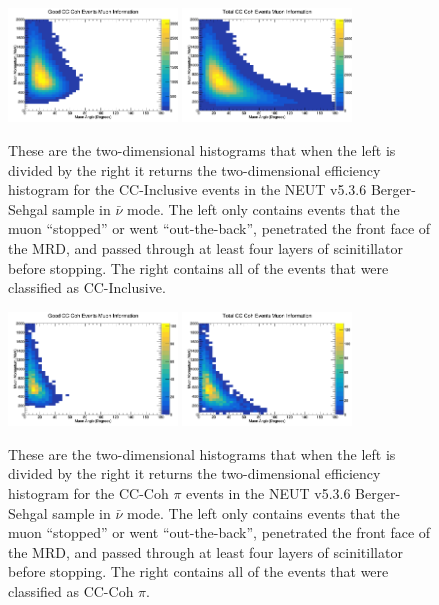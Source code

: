 \documentclass[11pt]{article}
\begin{document}
\begin{figure}[H]
\centering
\includegraphics[width=0.4\textwidth]{NewANMBergerSehgalImages/6-GoodCCCohMuonInfoANMBS.png}
\includegraphics[width=0.4\textwidth]{NewANMBergerSehgalImages/9-TotalCCCohMuonInfoANMBS.png}
\caption{These are the two-dimensional histograms that when the left is divided by the right it returns the two-dimensional efficiency histogram for the CC-Inclusive events in the NEUT v5.3.6 Berger-Sehgal sample in $\bar{\nu}$ mode. The left only contains events that the muon ``stopped'' or went ``out-the-back'', penetrated the front face of the MRD, and passed through at least four layers of scinitillator before stopping. The right contains all of the events that were classified as CC-Inclusive.}
\label{fig:app:ANMCCInclusiveMuon2DBS}
\end{figure}

\begin{figure}[H]
\centering
\includegraphics[width=0.4\textwidth]{NewANMBergerSehgalImages/7.png}
\includegraphics[width=0.4\textwidth]{NewANMBergerSehgalImages/8.png}
\caption{These are the two-dimensional histograms that when the left is divided by the right it returns the two-dimensional efficiency histogram for the CC-Coh $\pi$ events in the NEUT v5.3.6 Berger-Sehgal sample in $\bar{\nu}$ mode. The left only contains events that the muon ``stopped'' or went ``out-the-back'', penetrated the front face of the MRD, and passed through at least four layers of scinitillator before stopping. The right contains all of the events that were classified as CC-Coh $\pi$.}
\label{fig:app:ANMCCCohMuon2DBS}
\end{figure}
\end{document}
